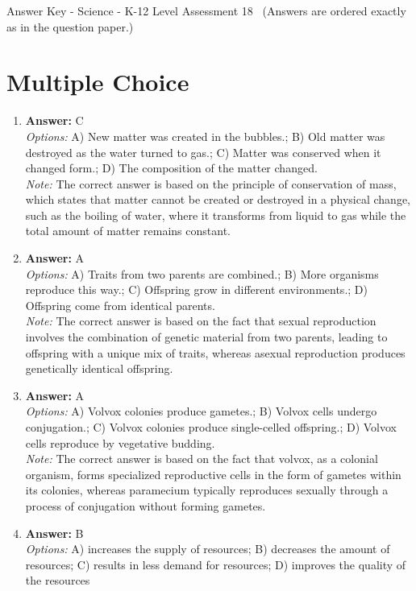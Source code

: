 \documentclass[12pt]{article}
\begin{document}
\begin{center}
Answer Key - Science - K-12 Level Assessment 18 \
\small (Answers are ordered exactly as in the question paper.)
\end{center}

\section*{Multiple Choice}
\begin{enumerate}[label=\arabic*.]
\item \textbf{Answer:} C
\\ \textit{Options:} A) New matter was created in the bubbles.; B) Old matter was destroyed as the water turned to gas.; C) Matter was conserved when it changed form.; D) The composition of the matter changed.
\\ \textit{Note:} The correct answer is based on the principle of conservation of mass, which states that matter cannot be created or destroyed in a physical change, such as the boiling of water, where it transforms from liquid to gas while the total amount of matter remains constant.
\item \textbf{Answer:} A
\\ \textit{Options:} A) Traits from two parents are combined.; B) More organisms reproduce this way.; C) Offspring grow in different environments.; D) Offspring come from identical parents.
\\ \textit{Note:} The correct answer is based on the fact that sexual reproduction involves the combination of genetic material from two parents, leading to offspring with a unique mix of traits, whereas asexual reproduction produces genetically identical offspring.
\item \textbf{Answer:} A
\\ \textit{Options:} A) Volvox colonies produce gametes.; B) Volvox cells undergo conjugation.; C) Volvox colonies produce single-celled offspring.; D) Volvox cells reproduce by vegetative budding.
\\ \textit{Note:} The correct answer is based on the fact that volvox, as a colonial organism, forms specialized reproductive cells in the form of gametes within its colonies, whereas paramecium typically reproduces sexually through a process of conjugation without forming gametes.
\item \textbf{Answer:} B
\\ \textit{Options:} A) increases the supply of resources; B) decreases the amount of resources; C) results in less demand for resources; D) improves the quality of the resources

\end{enumerate}
\end{document}
